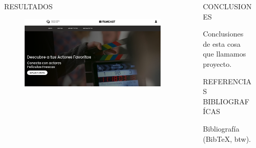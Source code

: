 \documentclass[final]{beamer}
\newlength{\sepwidth}
\newlength{\colwidth}
\newcommand{\separatorcolumn}{\begin{column}{\sepwidth}\end{column}}
\begin{document}
\begin{frame}[t]
\begin{columns}[t]
\begin{column}{\colwidth}
\begin{block}{RESULTADOS}
   \begin{figure}[H]
     \centering
     \includegraphics[width=\linewidth]{logos/webapp2.png}
   \end{figure}     

  \end{block}

\end{column}

\separatorcolumn

\begin{column}{\colwidth}

  \begin{block}{CONCLUSIONES}

    Conclusiones de esta cosa que llamamos proyecto.

  \end{block}

  \begin{block}{REFERENCIAS BIBLIOGRAFÍCAS}

    Bibliografía (BibTeX, btw).

  \end{block}

  

\end{column}
\separatorcolumn



\end{columns}
\end{frame}
\end{document}
